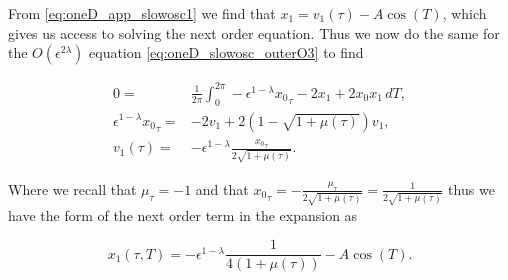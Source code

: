 From \eqref{eq:oneD_app_slowosc1} we find that $x_1=v_1(\tau)-A\cos(T)$, which gives us access to solving the next order equation. Thus we now do the same for the $O(\epsilon^{2\lambda})$ equation \eqref{eq:oneD_slowosc_outerO3} to find

\begin{equation}
\begin{aligned}
0=&\frac{1}{2\pi}\int_0^{2\pi}-\epsilon^{1-\lambda}{x_0}_\tau -2x_1+2x_0x_1\,dT,\\
\epsilon^{1-\lambda}{x_0}_\tau=& -2v_1+2(1-\sqrt{1+\mu(\tau)})v_1,\\
v_1(\tau) =& -\epsilon^{1-\lambda}\frac{{x_0}_\tau}{2\sqrt{1+\mu(\tau)}}.
\end{aligned}
\end{equation}

Where we recall that $\mu_\tau=-1$ and that ${x_0}_\tau = -\frac{{\mu}_\tau}{2\sqrt{1+\mu(\tau)}}=\frac{1}{2\sqrt{1+\mu(\tau)}}$ thus we have the form of the next order term in the expansion as

\begin{equation}
x_1(\tau,T) = -\epsilon^{1-\lambda}\frac{1}{4(1+\mu(\tau))}-A\cos(T).
\end{equation}